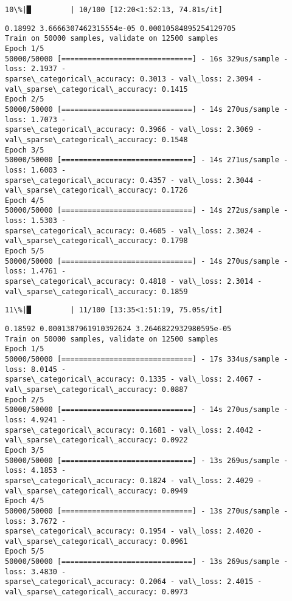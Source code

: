 \documentclass[11pt]{article}
\begin{document}
    \begin{Verbatim}[commandchars=\\\{\}]
 10\%|█         | 10/100 [12:20<1:52:13, 74.81s/it]
    \end{Verbatim}

    \begin{Verbatim}[commandchars=\\\{\}]
0.18992 3.6666307462315554e-05 0.00010584895254129705
Train on 50000 samples, validate on 12500 samples
Epoch 1/5
50000/50000 [==============================] - 16s 329us/sample - loss: 2.1937 -
sparse\_categorical\_accuracy: 0.3013 - val\_loss: 2.3094 -
val\_sparse\_categorical\_accuracy: 0.1415
Epoch 2/5
50000/50000 [==============================] - 14s 270us/sample - loss: 1.7073 -
sparse\_categorical\_accuracy: 0.3966 - val\_loss: 2.3069 -
val\_sparse\_categorical\_accuracy: 0.1548
Epoch 3/5
50000/50000 [==============================] - 14s 271us/sample - loss: 1.6003 -
sparse\_categorical\_accuracy: 0.4357 - val\_loss: 2.3044 -
val\_sparse\_categorical\_accuracy: 0.1726
Epoch 4/5
50000/50000 [==============================] - 14s 272us/sample - loss: 1.5303 -
sparse\_categorical\_accuracy: 0.4605 - val\_loss: 2.3024 -
val\_sparse\_categorical\_accuracy: 0.1798
Epoch 5/5
50000/50000 [==============================] - 14s 270us/sample - loss: 1.4761 -
sparse\_categorical\_accuracy: 0.4818 - val\_loss: 2.3014 -
val\_sparse\_categorical\_accuracy: 0.1859
    \end{Verbatim}

    \begin{Verbatim}[commandchars=\\\{\}]
 11\%|█         | 11/100 [13:35<1:51:19, 75.05s/it]
    \end{Verbatim}

    \begin{Verbatim}[commandchars=\\\{\}]
0.18592 0.0001387961910392624 3.2646822932980595e-05
Train on 50000 samples, validate on 12500 samples
Epoch 1/5
50000/50000 [==============================] - 17s 334us/sample - loss: 8.0145 -
sparse\_categorical\_accuracy: 0.1335 - val\_loss: 2.4067 -
val\_sparse\_categorical\_accuracy: 0.0887
Epoch 2/5
50000/50000 [==============================] - 14s 270us/sample - loss: 4.9241 -
sparse\_categorical\_accuracy: 0.1681 - val\_loss: 2.4042 -
val\_sparse\_categorical\_accuracy: 0.0922
Epoch 3/5
50000/50000 [==============================] - 13s 269us/sample - loss: 4.1853 -
sparse\_categorical\_accuracy: 0.1824 - val\_loss: 2.4029 -
val\_sparse\_categorical\_accuracy: 0.0949
Epoch 4/5
50000/50000 [==============================] - 13s 270us/sample - loss: 3.7672 -
sparse\_categorical\_accuracy: 0.1954 - val\_loss: 2.4020 -
val\_sparse\_categorical\_accuracy: 0.0961
Epoch 5/5
50000/50000 [==============================] - 13s 269us/sample - loss: 3.4830 -
sparse\_categorical\_accuracy: 0.2064 - val\_loss: 2.4015 -
val\_sparse\_categorical\_accuracy: 0.0973
    \end{Verbatim}
\end{document}
